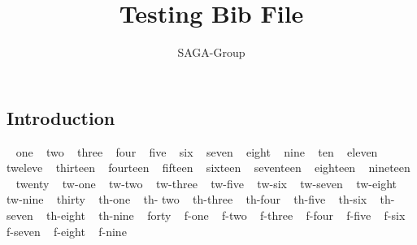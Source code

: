 \documentclass[a4paper,10pt]{article}
\newcommand{\jhanote}[1]{  {\textcolor{red}     { ***Shantenu: #1 }}}
\newcommand{\jhanote}[1]{}
\begin{document}
 \title{ \Large \vspace{-3.5em} Testing Bib File }
 
 \author{ SAGA-Group
 }
 \date{}
 \maketitle
 




\subsection*{Introduction}

~\cite{sirvent2005grid} one
~\cite {sagastuff} two
~\cite {saga-req} three
~\cite {Kaiser:2006qp} four
~\cite {saga-uc} five
  ~\cite {1267323} six
  ~\cite {ogf-gfd-71} seven
  ~\cite {kaiser2006saga} eight
  ~\cite{hirmer2006seamless} nine
    ~\cite {escience07} ten
    ~\cite {ogf-gfd-90} eleven
    ~\cite {saga_gin} tweleve
     ~\cite {saga_condor} thirteen
      ~\cite {Luckow:2008la} fourteen
       ~\cite {saga_gfd90} fifteen
       ~\cite{saga_url} sixteen
       ~\cite {ogf-gwd-r-96} seventeen
       ~\cite {saga_tg08} eighteen
       ~\cite{jha2009developing} nineteen 
       ~\cite {10.1109/GPC.2009.17} twenty
	~\cite {saga_data_intensive_abstractions} tw-one
	~\cite {sagamontage09} tw-two
	~\cite {dpagrid2009} tw-three
	~\cite {co2_escience2009} tw-five
	~\cite {repex_ptrsa} tw-six
	~\cite{gmac09} tw-seven
	~\cite{luckow2009adaptive} tw-eight
	~\cite{jha2009using} tw-nine
	~\cite{katz2009louisiana} thirty
	~\cite{2010RSPTA.368.4089M} th-one
	~\cite {saga_bigjob_condor_cloud} th- two
	~\cite{10.1109/CloudCom.2010.85} th-three
	~\cite{DBLP:conf/hpdc/KimHMAJ10} th-four
	~\cite{Sehgal2011590} th-five
	~\cite{ko-efficient} th-six
	~\cite{merzky-fresh} th-seven
	~\cite {jha-developing} th-eight
	~\cite {saga_mapreduce} th-nine
	~\cite {saga_condor_url} forty
	~\cite {remd-manager_url} f-one
	~\cite {gridrpc_url} f-two
	~\cite {jsaga} f-three
	~\cite {glite} f-four
	~\cite {ogf_web} f-five
	~\cite {saga_core_long} f-six
	~\cite {saga-tools} f-seven
	~\cite {saga-home} f-eight
	~\cite {async_repex11} f-nine
	

 
  
 
% 
\end{document}
